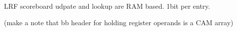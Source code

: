 LRF scoreboard udpate and lookup are RAM based. 1bit per entry.


(make a note that bb header for holding register operands is a CAM array)

% 
% 
% 
% 
